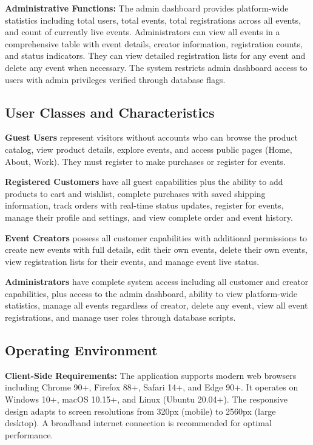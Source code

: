 ﻿\documentclass[11pt]{article}
\begin{document}
\textbf{Administrative Functions:} The admin dashboard provides platform-wide statistics including total users, total events, total registrations across all events, and count of currently live events. Administrators can view all events in a comprehensive table with event details, creator information, registration counts, and status indicators. They can view detailed registration lists for any event and delete any event when necessary. The system restricts admin dashboard access to users with admin privileges verified through database flags.

\subsection{User Classes and Characteristics}
\textbf{Guest Users} represent visitors without accounts who can browse the product catalog, view product details, explore events, and access public pages (Home, About, Work). They must register to make purchases or register for events.

\textbf{Registered Customers} have all guest capabilities plus the ability to add products to cart and wishlist, complete purchases with saved shipping information, track orders with real-time status updates, register for events, manage their profile and settings, and view complete order and event history.

\textbf{Event Creators} possess all customer capabilities with additional permissions to create new events with full details, edit their own events, delete their own events, view registration lists for their events, and manage event live status.

\textbf{Administrators} have complete system access including all customer and creator capabilities, plus access to the admin dashboard, ability to view platform-wide statistics, manage all events regardless of creator, delete any event, view all event registrations, and manage user roles through database scripts.

\subsection{Operating Environment}
\textbf{Client-Side Requirements:} The application supports modern web browsers including Chrome 90+, Firefox 88+, Safari 14+, and Edge 90+. It operates on Windows 10+, macOS 10.15+, and Linux (Ubuntu 20.04+). The responsive design adapts to screen resolutions from 320px (mobile) to 2560px (large desktop). A broadband internet connection is recommended for optimal performance.
\end{document}
